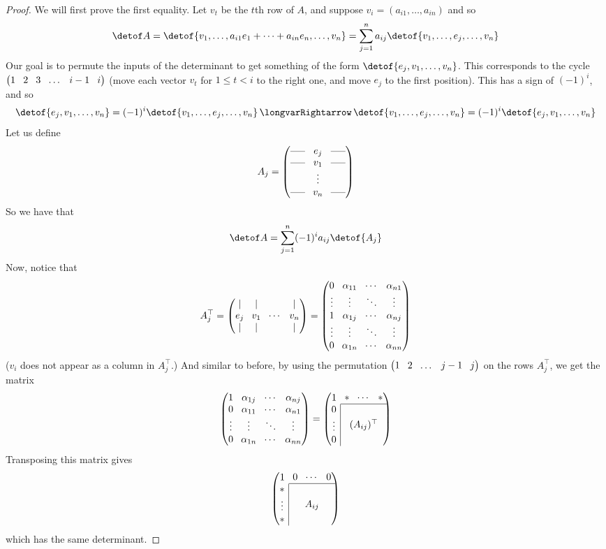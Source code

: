 \begin{proof}

    We will first prove the first equality.
    Let $v_t$ be the $t$th row of $A$, and suppose $v_i=(a_{i1},\dots,a_{in})$ and so
    \[ \detof A = \detof{v_1,\dots,a_{i1}e_1+\cdots+a_{in}e_n,\dots,v_n} = \sum_{j=1}^n a_{ij}\detof{v_1,\dots,e_j,\dots,v_n} \]
    Our goal is to permute the inputs of the determinant to get something of the form $\detof{e_j,v_1,\dots,v_n}$.
    This corresponds to the cycle $\pmat{1&2&3&\dots&i-1&i}$ (move each vector $v_t$ for $1\leq t<i$ to the right one, and move $e_j$ to the first position).
    This has a sign of $(-1)^i$, and so
    \[ \detof{e_j,v_1,\dots,v_n} = (-1)^i\detof{v_1,\dots,e_j,\dots,v_n} \implies \detof{v_1,\dots,e_j,\dots,v_n} = (-1)^i\detof{e_j,v_1,\dots,v_n} \]
    Let us define
    \[ A_j = \pmat{\hort&e_j&\hort\\\hort&v_1&\hort\\&\vdots&\\\hort&v_n&\hort} \]
    So we have that
    \[ \detof A = \sum_{j=1}^n(-1)^ia_{ij}\detof{A_j} \]
    Now, notice that
    \[ A_j^\top = \pmat{\vert & \vert & & \vert \\ e_j & v_1 & \cdots & v_n \\ \vert & \vert & & \vert} =
    \pmat{0 & \alpha_{11} & \cdots & \alpha_{n1} \\ \vdots & \vdots & \ddots & \vdots \\
    1 & \alpha_{1j} & \cdots & \alpha_{nj} \\ \vdots & \vdots & \ddots & \vdots \\
    0 & \alpha_{1n} & \cdots & \alpha_{nn}} \]
    ($v_i$ does not appear as a column in $A_j^\top$.)
    And similar to before, by using the permutation $\pmat{1&2&\dots&j-1&j}$ on the rows $A_j^\top$, we get the matrix
    \[ \pmat{1 & \alpha_{1j} & \cdots & \alpha_{nj} \\ 0 & \alpha_{11} & \cdots & \alpha_{n1} \\ \vdots & \vdots & \ddots & \vdots \\ 0 & \alpha_{1n} & \cdots & \alpha_{nn}} =
    \pmat{
    1 & \begin{matrix}* & \cdots & *\\\hline\end{matrix} \\
    \begin{matrix}0\\\vdots\\ 0\end{matrix}\hspace\arraycolsep\vline\hspace{-\arraycolsep}& (A_{ij})^\top} \]
    Transposing this matrix gives
    \[ \pmat{
    1 & \begin{matrix}0 & \cdots & 0\\\hline\end{matrix} \\
    \begin{matrix}*\\\vdots\\ *\end{matrix}\hspace\arraycolsep\vline\hspace{-\arraycolsep}& A_{ij}} \]
    which has the same determinant.


\end{proof}
